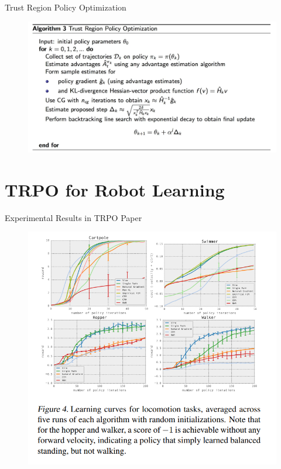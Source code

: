 \documentclass{beamer}
\begin{document}
\begin{frame}{Trust Region Policy Optimization}
    
    \begin{figure}
        \centering
        \includegraphics[width=1\linewidth]{trpo_algorithm_pseudocode.png}
        \label{fig:algo_pseudocode}
    \end{figure}    

    
\end{frame}

\section{TRPO for Robot Learning}
\begin{frame}{Experimental Results in TRPO Paper}    

\begin{figure}
    \centering
    \includegraphics[width=0.8\linewidth]{trpo_experimental_results.png}
    \label{fig:exp_results}
\end{figure}


\end{frame}
\end{document}
